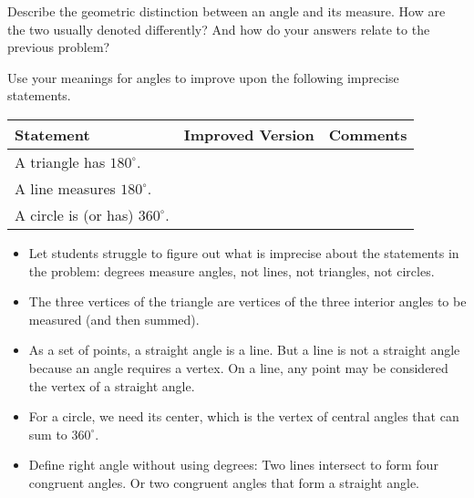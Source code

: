 \documentclass{ximera}
\begin{document}
\begin{problem}
Describe the geometric distinction between an angle and its measure.  How are the two usually denoted differently?  And how do your answers relate to the previous problem?  
\end{problem}
\vspace{.8in}

\begin{problem}
Use your meanings for angles to improve upon the following imprecise statements. 

\vspace{0.15in}

{\renewcommand{\arraystretch}{1.5}
\begin{tabular}{|>{\centering\arraybackslash}m{4cm}|>{\centering\arraybackslash}m{9.5cm}|>{\centering\arraybackslash}m{4cm}|}\hline
Statement & Improved Version & Comments \\\hline

\rule{0pt}{1cm}A triangle has $180^\circ$. & & \\ \hline

\rule{0pt}{1cm}A line measures $180^\circ$. & & \\ \hline

\rule{0pt}{1cm}A circle is (or has) $360^\circ$. & & \\ \hline
 \hline
\end{tabular}}
\end{problem}

\begin{teachingnote}
\begin{itemize}
\itemsep0em
\item Let students struggle to figure out what is imprecise about the statements in the problem:  degrees measure angles, not lines, not triangles, not circles. 
\item The three vertices of the triangle are vertices of the three interior angles to be measured (and then summed).  
\item As a set of points, a straight angle is a line.  But a line is not a straight angle because an angle requires a vertex.  On a line, any point may be considered the vertex of a straight angle.
\item For a circle, we need its center, which is the vertex of central angles 
that can sum to $360^\circ$.  
\item Define right angle without using degrees: Two lines intersect to form four congruent angles.  Or two congruent angles that form a straight angle.
\end{itemize}  
\end{teachingnote}
\end{document}
